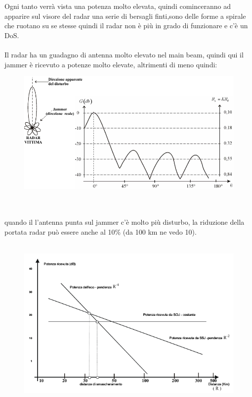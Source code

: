 \documentclass[oneside, 12pt]{extbook}
\begin{document}
Ogni tanto verrà vista una potenza molto elevata, quindi cominceranno ad apparire sul visore del radar una serie di bersagli finti,sono delle forme a spirale che ruotano su se stesse quindi il radar non è più in grado di funzionare e c'è un DoS.\\\\
Il radar ha un guadagno di antenna molto elevato nel main beam, quindi qui il jammer è ricevuto a potenze molto elevate, altrimenti di meno quindi:\\
\begin{figure}[!h]
	\includegraphics[scale=0.3]{immagini/localization/jamming-plot.png}
\end{figure}\\\\
quando il l'antenna punta sul jammer c'è molto più disturbo, la riduzione della portata radar può essere anche al 10\% (da 100 km ne vedo 10).\\\\
\begin{figure}[!h]
	\includegraphics[scale=0.4]{immagini/localization/jamming-power.png}
\end{figure}\\\\
\end{document}

